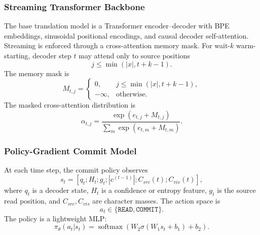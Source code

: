 \documentclass[conference]{IEEEtran}
\begin{document}
\subsubsection{Streaming Transformer Backbone}
The base translation model is a Transformer encoder--decoder with BPE embeddings, sinusoidal positional encodings, and causal decoder self-attention. Streaming is enforced through a cross-attention memory mask. For wait-$k$ warm-starting, decoder step $t$ may attend only to source positions
\begin{equation}
    j \le \min(|x|,t+k-1).
\end{equation}
The memory mask is
\begin{equation}
M_{t,j}=\begin{cases}
0, & j \le \min(|x|,t+k-1),\\
-\infty, & \text{otherwise.}
\end{cases}
\end{equation}
The masked cross-attention distribution is
\begin{equation}
    \alpha_{t,j}=\frac{\exp(e_{t,j}+M_{t,j})}{\sum_m \exp(e_{t,m}+M_{t,m})}.
\end{equation}

\subsubsection{Policy-Gradient Commit Model}
At each time step, the commit policy observes
\begin{equation}
    s_t=[q_t;H_t;g_t;|c^{(t-1)}|;C_{src}(t);C_{vis}(t)],
\end{equation}
where $q_t$ is a decoder state, $H_t$ is a confidence or entropy feature, $g_t$ is the source read position, and $C_{src},C_{vis}$ are character masses. The action space is
\begin{equation}
    a_t\in\{\texttt{READ},\texttt{COMMIT}\}.
\end{equation}
The policy is a lightweight MLP:
\begin{equation}
    \pi_\theta(a_t|s_t)=\operatorname{softmax}(W_2\sigma(W_1s_t+b_1)+b_2).
\end{equation}
\end{document}
